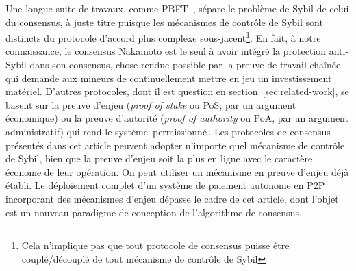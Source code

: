 \documentclass[letterpaper,twocolumn,10pt]{article}
\theoremstyle{definition}
\begin{document}
Une longue suite de travaux, comme PBFT~\cite{castro1999practical}, sépare le problème de Sybil de celui du consensus, à juste titre puisque les mécanismes de contrôle de Sybil sont distincts du protocole d'accord plus complexe sous-jacent\footnote{Cela n'implique pas que tout protocole de consensus puisse être couplé/découplé de tout mécanisme de contrôle de Sybil}.
En fait, à notre connaissance, le consensus Nakamoto est le seul à avoir intégré la protection anti-Sybil dans son consensus, chose rendue possible par la preuve de travail chaînée~\cite{aspnes2005exposing} qui demande aux mineurs de continuellement mettre en jeu un investissement matériel.
D'autres protocoles, dont il est question en section~\ref{sec:related-work}, se basent sur la preuve d'enjeu (\emph{proof of stake} ou PoS, par un argument économique) ou la preuve d'autorité (\emph{proof of authority} ou PoA, par un argument administratif) qui rend le système \guillemotleft\,permissionné\,\guillemotright.
Les protocoles de consensus présentés dans cet article peuvent adopter n'importe quel mécanisme de contrôle de Sybil, bien que la preuve d'enjeu soit la plus en ligne avec le caractère économe de leur opération.
On peut utiliser un mécanisme en preuve d'enjeu déjà établi.
Le déploiement complet d'un système de paiement autonome en P2P incorporant des mécanismes d'enjeu dépasse le cadre de cet article, dont l'objet est un nouveau paradigme de conception de l'algorithme de consensus.
\end{document}
